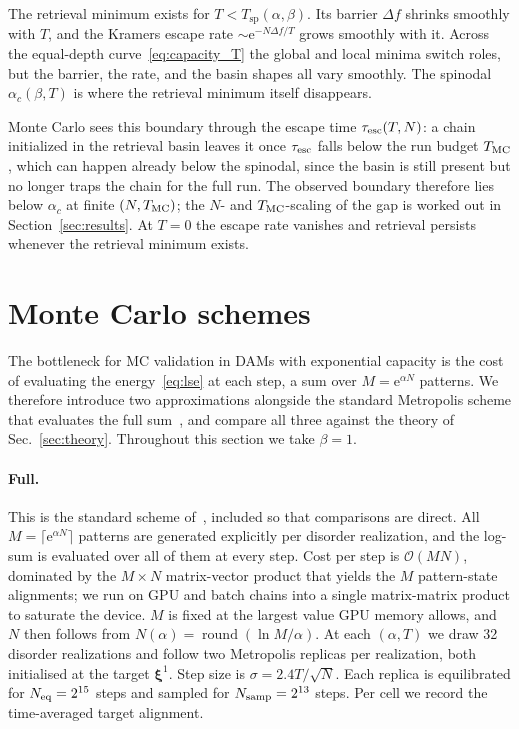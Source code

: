 \documentclass[letterpaper]{article} %
\newcommand{\bxi}{\boldsymbol{\xi}}
\newcommand{\e}{{\mathrm{e}}}
\newcommand{\Bnet}{\beta}
\newcommand{\ac}{\alpha_c}
\begin{document}
The retrieval minimum exists for $T < T_{\mathrm{sp}}(\alpha, \Bnet)$. Its barrier $\Delta f$ shrinks smoothly with $T$, and the Kramers escape rate $\sim \e^{-N \Delta f / T}$ grows smoothly with it. Across the equal-depth curve~\eqref{eq:capacity_T} the global and local minima switch roles, but the barrier, the rate, and the basin shapes all vary smoothly. The spinodal $\ac(\Bnet, T)$ is where the retrieval minimum itself disappears.

Monte Carlo sees this boundary through the escape time $\tau_{\rm esc}(T, N)$: a chain initialized in the retrieval basin leaves it once $\tau_{\rm esc}$ falls below the run budget $T_{\rm MC}$, which can happen already below the spinodal, since the basin is still present but no longer traps the chain for the full run. The observed boundary therefore lies below $\ac$ at finite $(N, T_{\rm MC})$; the $N$- and $T_{\rm MC}$-scaling of the gap is worked out in Section~\ref{sec:results}. At $T = 0$ the escape rate vanishes and retrieval persists whenever the retrieval minimum exists.


\section{Monte Carlo schemes}
\label{sec:mc}

The bottleneck for MC validation in DAMs with exponential capacity is the cost of evaluating the energy~\eqref{eq:lse} at each step, a sum over $M = \e^{\alpha N}$ patterns. We therefore introduce two approximations alongside the standard Metropolis scheme that evaluates the full sum~\citep[e.g.,][]{iclr2026mc}, and compare all three against the theory of Sec.~\ref{sec:theory}. Throughout this section we take $\Bnet = 1$.

\paragraph{Full.} This is the standard scheme of~\citet{iclr2026mc}, included so that comparisons are direct. All $M = \lceil\e^{\alpha N}\rceil$ patterns are generated explicitly per disorder realization, and the log-sum is evaluated over all of them at every step. Cost per step is $\mathcal{O}(MN)$, dominated by the $M \times N$ matrix-vector product that yields the $M$ pattern-state alignments; we run on GPU and batch chains into a single matrix-matrix product to saturate the device. $M$ is fixed at the largest value GPU memory allows, and $N$ then follows from $N(\alpha) = \operatorname{round}(\ln M / \alpha)$. At each $(\alpha, T)$ we draw 32 disorder realizations and follow two Metropolis replicas per realization, both initialised at the target $\bxi^1$. Step size is $\sigma = 2.4 T / \sqrt N$. Each replica is equilibrated for $N_{\rm eq} = 2^{15}$ steps and sampled for $N_{\rm samp} = 2^{13}$ steps. Per cell we record the time-averaged target alignment.
\end{document}
